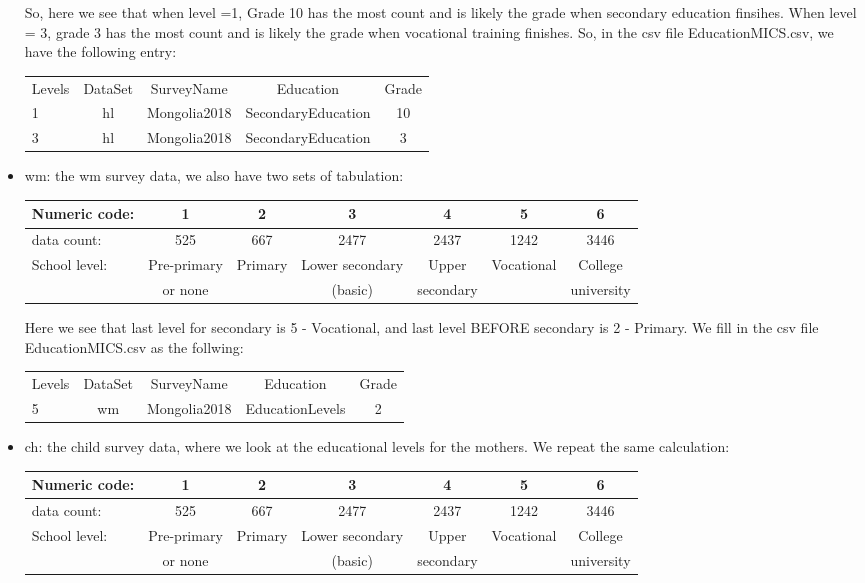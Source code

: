 \documentclass[12pt]{article}
\begin{document}
\begin{itemize}
    So, here we see that when level =1, Grade 10 has the most count and is likely the grade when secondary education finsihes. When level = 3, grade 3 has the most count and is likely the grade when vocational training finishes.
    So, in the csv file EducationMICS.csv, we have the following entry:
    
    \begin{tabular}{|l|c|c|c|c|}
    \hline
    Levels & DataSet & SurveyName & Education & Grade\\
    1 & hl & Mongolia2018 & SecondaryEducation & 10 \\
    3 & hl & Mongolia2018 & SecondaryEducation & 3 \\
    \hline
	\end{tabular}
     
	\item wm: the wm survey data, we also have two sets of tabulation:
	
	{\small
	\begin{tabular}{l|c|c|c|c|c|c|}
	\hline
	Numeric code:  &  1  &    2 & 3  & 4  & 5  & 6\\ 
	\hline
	data count: & 525  &  667 &  2477 &  2437  & 1242 &  3446\\ 
	\hline
	School level: &  Pre-primary & Primary & Lower secondary  & Upper  & Vocational & College \\
	 &  or none &  & (basic) & secondary & & university \\
	\hline
	\end{tabular}
    }

Here we see that last level for secondary is 5 - Vocational, and last level BEFORE secondary is 2 - Primary.
We fill in the  csv file EducationMICS.csv as the follwing:

    \begin{tabular}{|l|c|c|c|c|}
	\hline
	Levels & DataSet & SurveyName & Education & Grade\\
	5 & wm & Mongolia2018 & EducationLevels & 2 \\
	\hline
\end{tabular}

	\item ch: the child survey data, where we look at the educational levels for the mothers. We repeat the same calculation:
	
	{\small
		\begin{tabular}{l|c|c|c|c|c|c|}
			\hline
			Numeric code:  &  1  &    2 & 3  & 4  & 5  & 6\\ 
			\hline
			data count: & 525  &  667 &  2477 &  2437  & 1242 &  3446\\ 
			\hline
			School level: &  Pre-primary & Primary & Lower secondary  & Upper  & Vocational & College \\
			&  or none &  & (basic) & secondary & & university \\
			\hline
		\end{tabular}
	}
	

\end{itemize}
\end{document}

